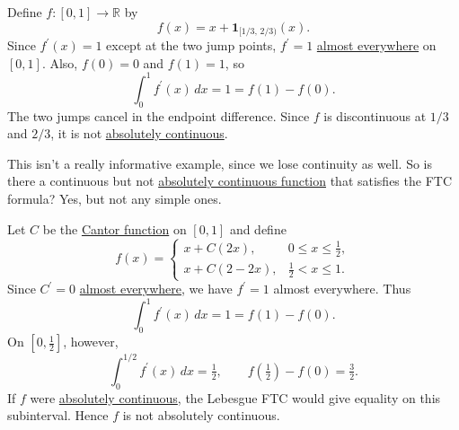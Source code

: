 	\begin{example}
		Define $f:[0,1]\to\mathbb{R}$ by
		\begin{equation}
			f(x)=x+\mathbf{1}_{[1/3,\,2/3)}(x).
		\end{equation}
		Since $f^\prime(x)=1$ except at the two jump points, $f^\prime=1$ \hyperref[def:almost_everywhere]{almost everywhere} on $[0,1]$. Also, $f(0)=0$ and $f(1)=1$, so
		\begin{equation}
			\int_0^1 f^\prime(x)\,dx = 1 = f(1)-f(0).
		\end{equation}
		The two jumps cancel in the endpoint difference. Since $f$ is discontinuous at $1/3$ and $2/3$, it is not \hyperref[def:absolutely-continuous-function]{absolutely continuous}.
	\end{example}

	This isn't a really informative example, since we lose continuity as well. So is there a continuous but not \hyperref[def:absolutely-continuous-function]{absolutely continuous function} that satisfies the FTC formula? Yes, but not any simple ones.

	\begin{example}
		\label{ex:a-function-satisfying-the-ftc-formula-but-not-ac}
		Let $C$ be the \hyperref[real-def:cantor-lebesgue-function-devils-staircase]{Cantor function} on $[0,1]$ and define
		\begin{equation}
			f(x)= \begin{cases}
				x+C(2x), & 0\le x\le \tfrac12,\\
				x+C(2-2x), & \tfrac12<x\le 1.
			\end{cases}
		\end{equation}
		Since $C^\prime=0$ \hyperref[def:almost_everywhere]{almost everywhere}, we have $f^\prime=1$ almost everywhere. Thus
		\begin{equation}
			\int_0^1 f^\prime(x)\,dx=1=f(1)-f(0).
		\end{equation}
		On $[0,\tfrac12]$, however,
		\begin{equation}
			\int_0^{1/2} f^\prime(x)\,dx=\tfrac12, \qquad f(\tfrac12)-f(0)=\tfrac32.
		\end{equation}
		If $f$ were \hyperref[def:absolutely-continuous-function]{absolutely continuous}, the Lebesgue FTC would give equality on this subinterval. Hence $f$ is not absolutely continuous.
	\end{example}

